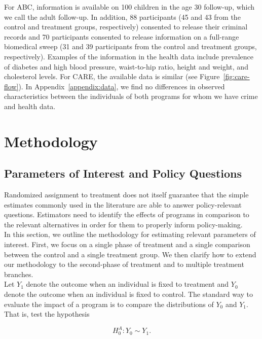 \noindent For ABC, information is available on 100 children in the age 30 follow-up, which we call the adult follow-up. In addition, 88 participants (45 and 43 from the control and treatment groups, respectively) consented to release their criminal records and 70 participants consented to release information on a full-range biomedical sweep (31 and 39 participants from the control and treatment groups, respectively). Examples of the information in the health data include prevalence of diabetes and high blood pressure, waist-to-hip ratio, height and weight, and cholesterol levels. For CARE, the available data is similar (see Figure~\ref{fig:care-flow}). In Appendix~\ref{appendix:data}, we find no differences in observed characteristics between the individuals of both programs for whom we have crime and health data.

\section{Methodology} \label{section:methodology}

\subsection{Parameters of Interest and Policy Questions} \label{section:methodsquestions}

\noindent Randomized assignment to treatment does not itself guarantee that the simple estimates commonly used in the literature are able to answer policy-relevant questions. Estimators need to identify the effects of programs in comparison to the relevant alternatives in order for them to properly inform policy-making.\\

\noindent In this section, we outline the methodology for estimating relevant parameters of interest. First, we focus on a single phase of treatment and a single comparison between the control and a single treatment group. We then clarify how to extend our methodology to the second-phase of treatment and to multiple treatment branches.\\

\noindent Let $Y_{1}$ denote the outcome when an individual is fixed to treatment and $Y_{0}$ denote the outcome when an individual is fixed to control. The standard way to evaluate the impact of a program is to compare the distributions of $Y_{0}$ and $Y_{1}$. That is, test the hypothesis 

\begin{equation}
H_{0}^A: Y_{0} \sim Y_{1}. \label{eq:ho}
\end{equation}

